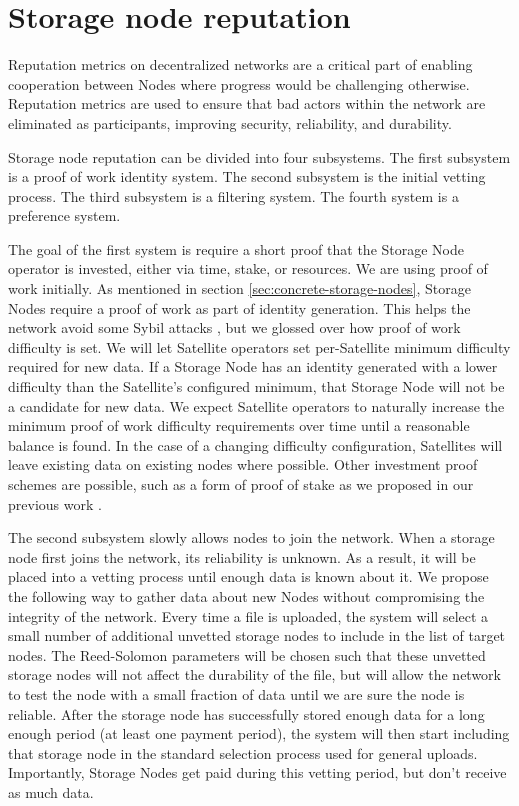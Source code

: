 \documentclass[8pt,fleqn,openany]{book}
\begin{document}
\section{Storage node reputation}\label{sec:concrete-reputation}

Reputation metrics on decentralized networks are a critical part of
enabling cooperation
between Nodes
where progress would be challenging otherwise. Reputation metrics
are used to ensure that bad actors
within the network are eliminated as participants, improving security,
reliability, and durability.

Storage node reputation can be divided into four subsystems.
The first subsystem is a proof of work identity system.
The second subsystem is the initial vetting process.
The third subsystem is a filtering system.
The fourth system is a preference system.

The goal of the first system is require a short proof that the Storage Node
operator is invested, either via time, stake, or resources. We are using
proof of work initially.
As mentioned in section \ref{sec:concrete-storage-nodes}, Storage Nodes require
a proof of work as part of identity generation. This helps the network avoid
some Sybil attacks \cite{sybil-attack}, but we glossed over how proof of work
difficulty is set. We will let Satellite operators set per-Satellite minimum
difficulty required for new data. If a Storage Node has an identity generated
with a lower difficulty than the Satellite's configured minimum, that Storage
Node will not be a candidate for new data.
We expect Satellite operators to naturally increase the minimum proof of work
difficulty requirements over time until a reasonable balance is found.
In the case of a changing difficulty configuration, Satellites will leave
existing data on existing nodes where possible.
Other investment proof schemes are possible, such as a form of proof of stake as
we proposed in our previous work \cite{sybil-cost}.

The second subsystem slowly allows nodes to join the network.
When a storage node first joins the network, its reliability is unknown.
As a result, it will be placed into a vetting
process until enough data is known about it.
We propose the following way to gather data about new Nodes
without compromising the integrity of the network.
Every time a file is uploaded, the system will select a small number of
additional unvetted storage nodes to include in the list of target nodes.
The Reed-Solomon parameters will be chosen such that these unvetted storage
nodes will not affect the durability of the file, but will allow the network
to test the node
with a small fraction of data until we are sure the node is reliable.
After the storage node has successfully stored enough data for a long enough
period (at least one payment period),
the system will then start including that storage
node in the standard selection process used for general uploads.
Importantly, Storage Nodes get paid during this
vetting period, but don't receive as much data.
\end{document}
